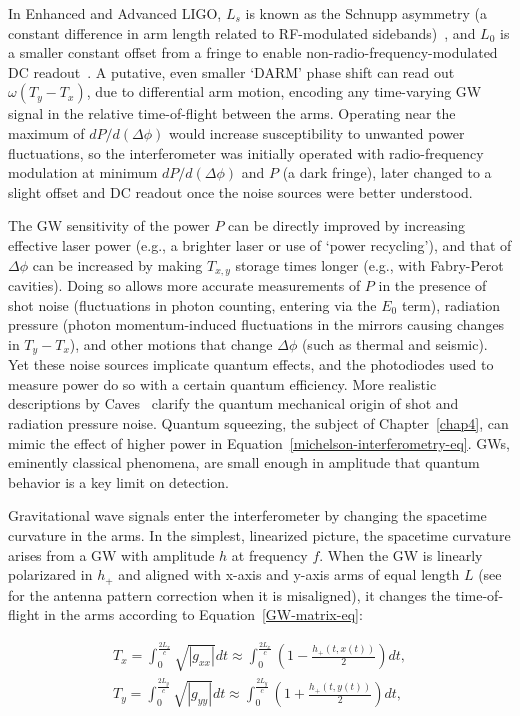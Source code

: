 In Enhanced and Advanced LIGO, $L_s$ is known as the Schnupp asymmetry (a constant difference in arm length related to RF-modulated sidebands)~\cite{AdhikariThesis}, and $L_0$ is a smaller constant offset from a fringe to enable non-radio-frequency-modulated DC readout~\cite{FrickeThesis}.
A putative, even smaller `DARM' phase shift can read out $\omega (T_y -T_x)$, due to differential arm motion, encoding any time-varying GW signal in the relative time-of-flight between the arms. 
Operating near the maximum of $dP/d(\Delta\phi)$ would increase susceptibility to unwanted power fluctuations, so the interferometer was initially operated with radio-frequency modulation at minimum $dP/d(\Delta\phi)$ and  $P$ (a dark fringe), later changed to a slight offset and DC readout once the noise sources were better understood.

The GW sensitivity of the power $P$ can be directly improved by increasing effective laser power (e.g., a brighter laser or use of `power recycling'), and that of $\Delta \phi$ can be increased by making $T_{x,y}$ storage times longer (e.g., with Fabry-Perot cavities).
Doing so allows more accurate measurements of $P$ in the presence of shot noise (fluctuations in photon counting, entering via the $E_0$ term), radiation pressure (photon momentum-induced fluctuations in the mirrors causing changes in $T_y - T_x$), and other motions that change $\Delta \phi$ (such as thermal and seismic).
Yet these noise sources implicate quantum effects, and the photodiodes used to measure power do so with a certain quantum efficiency.
More realistic descriptions by Caves~\cite{Caves1980,Caves1981} clarify the quantum mechanical origin of shot and radiation pressure noise.
Quantum squeezing, the subject of Chapter~\ref{chap4}, can mimic the effect of higher power in Equation~\ref{michelson-interferometry-eq}.
GWs, eminently classical phenomena, are small enough in amplitude that quantum behavior is a key limit on detection.

Gravitational wave signals enter the interferometer by changing the spacetime curvature in the arms. 
In the simplest, linearized picture, the spacetime curvature arises from a GW with amplitude $h$ at frequency $f$.
When the GW is linearly polarizared in $h_+$ and aligned with x-axis and y-axis arms of equal length $L$ (see~\cite{Jaranowski1998} for the antenna pattern correction when it is misaligned), it changes the time-of-flight in the arms according to Equation~\ref{GW-matrix-eq}:

\begin{eqnarray}
T_x = \int_0^{\frac{2L_x}{c}} \sqrt{|g_{xx}|} dt \approx \int_0^{\frac{2L_x}{c}} \left(1 - \frac{h_+ (t,x(t))}{2} \right) dt, \\
T_y = \int_0^{\frac{2L_y}{c}} \sqrt{|g_{yy}|} dt \approx \int_0^{\frac{2L_y}{c}} \left(1 + \frac{h_+ (t, y(t))}{2} \right) dt,
\end{eqnarray}

